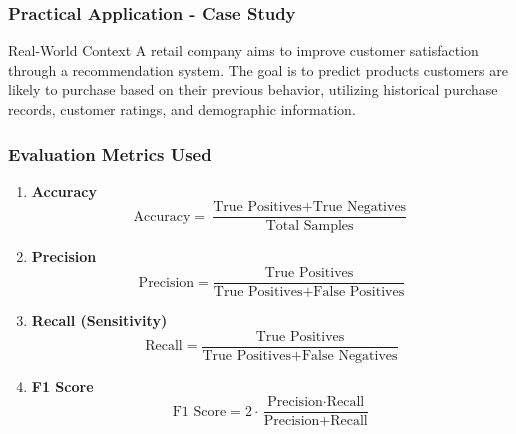 \documentclass[aspectratio=169]{beamer}
\begin{document}
\begin{frame}[fragile]
    \frametitle{Practical Application - Case Study}
    \begin{block}{Real-World Context}
        A retail company aims to improve customer satisfaction through a recommendation system. The goal is to predict products customers are likely to purchase based on their previous behavior, utilizing historical purchase records, customer ratings, and demographic information.
    \end{block}
\end{frame}

\begin{frame}[fragile]
    \frametitle{Evaluation Metrics Used}
    \begin{enumerate}
        \item \textbf{Accuracy}
        \begin{equation}
            \text{Accuracy} = \frac{\text{True Positives} + \text{True Negatives}}{\text{Total Samples}}
        \end{equation}

        \item \textbf{Precision}
        \begin{equation}
            \text{Precision} = \frac{\text{True Positives}}{\text{True Positives} + \text{False Positives}}
        \end{equation}

        \item \textbf{Recall (Sensitivity)}
        \begin{equation}
            \text{Recall} = \frac{\text{True Positives}}{\text{True Positives} + \text{False Negatives}}
        \end{equation}

        \item \textbf{F1 Score}
        \begin{equation}
            \text{F1 Score} = 2 \cdot \frac{\text{Precision} \cdot \text{Recall}}{\text{Precision} + \text{Recall}}
        \end{equation}
    \end{enumerate}
\end{frame}
\end{document}
